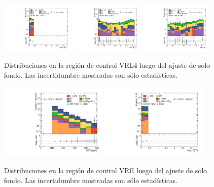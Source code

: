 \begin{figure}[ht!]
\begin{center}
    \includegraphics[width=0.32\textwidth]{images_tmp/results/fr2/can_VRL4_dphi_jetmet_afterFit.pdf}
    \includegraphics[width=0.32\textwidth]{images_tmp/results/fr2/can_VRL4_dphi_gammet_afterFit.pdf}
    \includegraphics[width=0.32\textwidth]{images_tmp/results/fr2/can_VRL4_dphi_gamjet_afterFit.pdf}

    \caption{Distribuciones en la región de control VRL4 luego del ajuste de solo fondo. Las incertidumbre mostradas son sólo estadísticas.}
    \label{fig:dist_vrl4_bkgonly}
  \end{center}
\end{figure}


\begin{figure}[ht!]
  \begin{center}
    \includegraphics[width=0.47\textwidth]{images_tmp/results/fr2/can_VRE_met_et_afterFit.pdf}
    \includegraphics[width=0.47\textwidth]{images_tmp/results/fr2/can_VRE_dphi_gammet_afterFit.pdf}
    \caption{Distribuciones en la región de control VRE luego del ajuste de solo fondo. Las incertidumbre mostradas son sólo estadísticas.}
    \label{fig:dist_vre_bkgonly}
  \end{center}
\end{figure}

